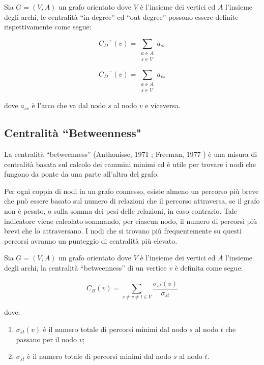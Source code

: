 \begin{defn}
Sia \( G = (V,A) \) un grafo orientato dove \( V \) {\`e} l'insieme dei vertici ed \( A \) l'insieme degli archi, le centralit{\`a} ``in-degree'' ed ``out-degree'' possono essere definite rispettivamente come segue:

\begin{equation}
{C_D}^+(v) =  \sum_{\substack{a \in A \\ s \in V}} a_{sv}
\end{equation}

\begin{equation}
{C_D}^-(v) =  \sum_{\substack{a \in A \\ s \in V}} a_{vs}
\end{equation}

dove \( a_{sv} \) {\`e} l'arco che va dal nodo \( s \) al nodo \( v \) e viceversa.
\end{defn}

\subsection{Centralit{\`a} ``Betweenness"}

La centralit{\`a} ``betweenness'' (Anthonisse, 1971 \cite{Anthonisse-betweenness}; Freeman, 1977 \cite{Freeman-betweenness}) {\`e} una misura di centralit{\`a} basata sul calcolo dei cammini minimi ed {\`e} utile per trovare i nodi che fungono da ponte da una parte all'altra del grafo.

Per ogni coppia di nodi in un grafo connesso, esiste almeno un percorso pi{\`u} breve che pu{\`o} essere basato sul numero di relazioni che il percorso attraversa, se il grafo non {\`e} pesato, o sulla somma dei pesi delle relazioni, in caso contrario. Tale indicatore viene calcolato sommando, per ciascun nodo, il numero di percorsi pi{\`u} brevi che lo attraversano. I nodi che si trovano pi{\`u} frequentemente su questi percorsi avranno un punteggio di centralit{\`a} pi{\`u} elevato. 

\begin{defn}
Sia \( G = (V,A) \) un grafo orientato dove \( V \) {\`e} l'insieme dei vertici ed \( A \) l'insieme degli archi, la centralit{\`a} ``betweenness'' di un vertice \( v \) {\`e} definita come segue:

\begin{equation}
C_B(v) = \sum_{s \neq v \neq t \in V} \frac{\sigma_{st}(v)}{\sigma_{st}}
\end{equation}

dove:

\begin{enumerate}[label=(\roman*)]
  
\item \( \sigma_{st}(v) \) {\`e} il numero totale di percorsi minimi dal nodo \( s \) al nodo \( t \) che passano per il nodo \( v \);
\item \( \sigma_{st} \) {\`e} il numero totale di percorsi minimi dal nodo \( s \) al nodo \( t \).

\end{enumerate}
\end{defn}

